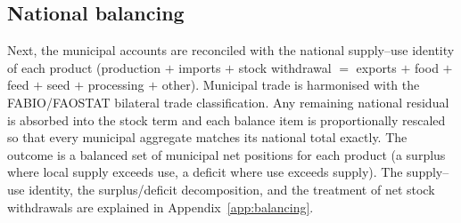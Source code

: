 \documentclass[pdflatex,sn-nature]{sn-jnl}%
\begin{document}
\subsection{National balancing}\label{subsec:balancing}
Next, the municipal accounts are reconciled with the national supply--use
identity of each product (production $+$ imports $+$ stock withdrawal $=$
exports $+$ food $+$ feed $+$ seed $+$ processing $+$ other). Municipal
trade is harmonised with the FABIO/FAOSTAT bilateral trade classification.
Any remaining national residual is absorbed into the stock term and each
balance item is proportionally rescaled so that every municipal aggregate
matches its national total exactly. The outcome is a balanced set of
municipal net positions for each product (a surplus where local supply
exceeds use, a deficit where use exceeds supply). The supply--use identity,
the surplus/deficit decomposition, and the treatment of net stock
withdrawals are explained in Appendix~\ref{app:balancing}.

\end{document}
